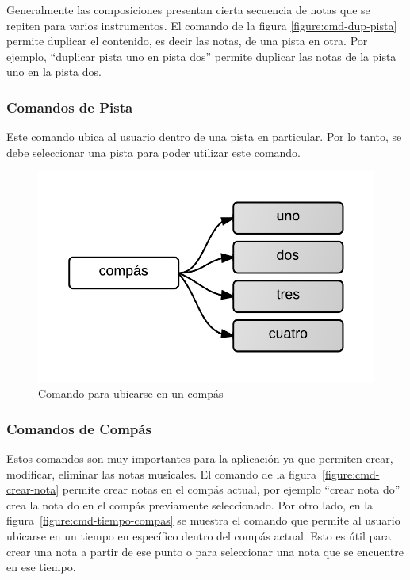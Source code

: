 Generalmente las composiciones presentan cierta secuencia de notas que se repiten para varios 
instrumentos. El comando de la figura \ref{figure:cmd-dup-pista} permite duplicar el contenido, 
es decir las notas, de una pista en otra. Por ejemplo, 
``duplicar pista uno en pista dos'' permite duplicar las notas de la pista uno en la pista dos.

\subsubsection{Comandos de Pista} 

Este comando ubica al usuario dentro de una pista en particular. Por lo tanto, se debe
seleccionar una pista para poder utilizar este comando.

\begin{figure}[H] 
\centering
\includegraphics[width=0.4\linewidth]{./graphics/cmd-compas.png}
\caption{Comando para ubicarse en un comp\'as}
\label{figure:cmd-compas}
\quad
\end{figure}

\subsubsection{Comandos de Comp\'as}

Estos comandos son muy importantes para la aplicaci\'on ya que permiten crear, modificar, 
eliminar las notas musicales. El comando de la figura~\ref{figure:cmd-crear-nota} permite crear notas en el  
comp\'as actual, por ejemplo ``crear nota do'' crea la nota do en el comp\'as previamente seleccionado. Por otro lado, en la figura~\ref{figure:cmd-tiempo-compas} 
se muestra el comando que permite al usuario ubicarse en un  
tiempo en espec\'ifico dentro del comp\'as actual. Esto es \'util para crear una nota a partir de ese punto o 
para seleccionar una nota que se encuentre en ese tiempo.

